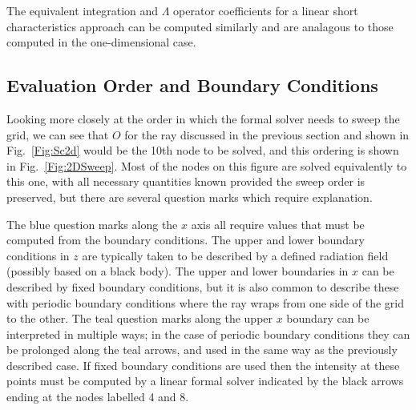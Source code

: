 The equivalent integration and $\Lambda$ operator coefficients for a linear short characteristics approach can be computed similarly and are analagous to those computed in the one-dimensional case.


\subsection{Evaluation Order and Boundary Conditions}

Looking more closely at the order in which the formal solver needs to sweep the grid, we can see that $O$ for the ray discussed in the previous section and shown in Fig.~\ref{Fig:Sc2d} would be the 10th node to be solved, and this ordering is shown in Fig.~\ref{Fig:2DSweep}.
Most of the nodes on this figure are solved equivalently to this one, with all necessary quantities known provided the sweep order is preserved, but there are several question marks which require explanation.

The {\color{TolBlue} blue} question marks along the $x$ axis all require values that must be computed from the boundary conditions.
The upper and lower boundary conditions in $z$ are typically taken to be described by a defined radiation field (possibly based on a black body).
The upper and lower boundaries in $x$ can be described by fixed boundary conditions, but it is also common to describe these with periodic boundary conditions where the ray wraps from one side of the grid to the other.
The {\color{TolTeal} teal} question marks along the upper $x$ boundary can be interpreted in multiple ways; in the case of periodic boundary conditions they can be prolonged along the {\color{TolTeal} teal} arrows, and used in the same way as the previously described case.
If fixed boundary conditions are used then the intensity at these points must be computed by a linear formal solver indicated by the black arrows ending at the nodes labelled 4 and 8.



